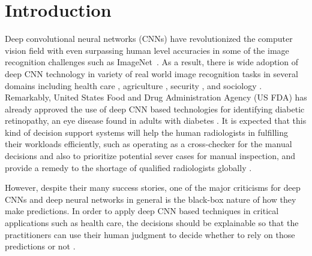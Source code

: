 \section{Introduction}
Deep convolutional neural networks (CNNs) \cite{alexnet, vggnet, resnet, inception} have revolutionized the computer vision field with even surpassing human level accuracies in some of the image recognition challenges such as ImageNet~\cite{imagenet}.
As a result, there is wide adoption of deep CNN technology in variety of real world image recognition tasks in several domains including health care \cite{kermany2018identifying, islam2017abnormality}, agriculture \cite{mohanty2016using}, security \cite{arbabzadah2016identifying}, and sociology \cite{wang2017deep}.
Remarkably, United States Food and Drug Administration Agency (US FDA) has already approved the use of deep CNN based technologies for identifying diabetic retinopathy, an eye disease found in adults with diabetes \cite{fdaretinopathy}.
It is expected that this kind of decision support systems will help the human radiologists in fulfilling their workloads efficiently, such as operating as a cross-checker for the manual decisions and also to prioritize potential sever cases for manual inspection, and provide a remedy to the shortage of qualified radiologists globally \cite{radiologistshortage}.

However, despite their many success stories, one of the major criticisms for deep CNNs and deep neural networks in general is the black-box nature of how they make predictions.
In order to apply deep CNN based techniques in critical applications such as health care, the decisions should be explainable so that the practitioners can use their human judgment to decide whether to rely on those predictions or not \cite{jung2017deep}.

